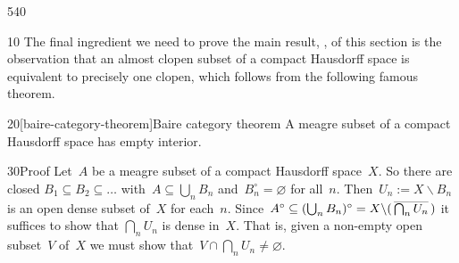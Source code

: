 \begin{parsec}{540}%
\begin{point}{10}%
The final ingredient
we need to prove the main result, ,
of this section
is the observation
that an almost clopen subset of a compact Hausdorff space
is equivalent to precisely one clopen,
which follows from the following famous theorem.
\end{point}
\begin{point}{20}[baire-category-theorem]{Baire category theorem}%
A meagre subset of a compact Hausdorff space
has empty interior.
\begin{point}{30}{Proof}%
Let~$A$ be a meagre subset of a compact Hausdorff space~$X$.
So there are closed $B_1\subseteq B_2\subseteq \dotsc$
with~$A\subseteq \bigcup_n B_n$
and~$B_n^\circ=\varnothing$ for all~$n$.
Then~$U_n:= X\backslash B_n$
is an open dense subset of~$X$
for each~$n$.
Since~$A^\circ \subseteq (\bigcup_n B_n)^\circ  =
X\backslash (\,\smash{\overline{\bigcap_n U_n}}\,)$
it suffices to show that
$\bigcap_n U_n$ is dense in~$X$.
That is, given a non-empty open subset~$V$
of~$X$ we must show that~$V\cap\bigcap_n U_n\neq \varnothing$.


\end{point}
\end{point}
\end{parsec}
